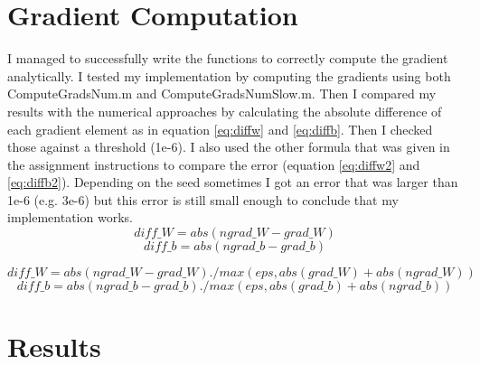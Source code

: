 \section{Gradient Computation}
I managed to successfully write the functions to correctly compute the gradient analytically.
I tested my implementation by computing the gradients using both ComputeGradsNum.m and ComputeGradsNumSlow.m.
Then I compared my results with the numerical approaches by calculating the absolute difference of each gradient element as in equation
\eqref{eq:diffw} and \eqref{eq:diffb}. 
Then I checked those against a threshold (1e-6). I also used the other formula that was given in the assignment instructions to
compare the error (equation \eqref{eq:diffw2} and \eqref{eq:diffb2}).
Depending on the seed sometimes I got an error that was larger than 1e-6 (e.g. 3e-6) but this error is still
small enough to conclude that my implementation works.\\

\begin{equation}\label{eq:diffw}
    diff\_W = abs(ngrad\_W - grad\_W)
\end{equation}
\begin{equation}\label{eq:diffb}
    diff\_b = abs(ngrad\_b - grad\_b)
\end{equation}

\begin{equation}\label{eq:diffw2}
    diff\_W = abs(ngrad\_W - grad\_W)./max(eps, abs(grad\_W) + abs(ngrad\_W))
\end{equation}
\begin{equation}\label{eq:diffb2}
    diff\_b = abs(ngrad\_b - grad\_b)./max(eps, abs(grad\_b) + abs(ngrad\_b))
\end{equation}

\section{Results} 
\label{sec:results}

